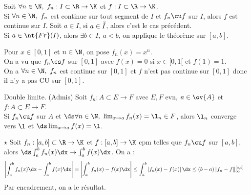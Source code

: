 \documentclass[11pt]{article}
\begin{document}
\vspace*{-0.8cm}

\begin{corr}{}{}
    Soit $\forall n \in \N, ~ f_n:I\subset\R\to\K$ et $f:I\subset\R\to\K$.\\
    Si $\forall n \in \N, ~ f_n$ est continue sur tout segment de $I$ et $f_n\cu f$ sur $I$, alors $f$ est continue sur $I$.
    \tcblower
    Soit $a\in I$, si $a\in\accentset{\circ}{I}$, alors c'est le cas précédent.\\
    Si $a\in\nt{Fr}(I)$, alors $\exists b \in I, ~ a < b$, on applique le théorème sur $[a,b]$.
\end{corr}

\vspace*{-0.8cm}

\begin{ex}{}{}
    Pour $x\in[0,1]$ et $n\in\N$, on pose $f_n(x)=x^n$.\\
    On a vu que $f_n\cs f$ sur $[0,1]$ avec $f(x)=0$ si $x\in[0,1[$ et $f(1)=1$.\\
    On a $\forall n \in \N, ~ f_n$ est continue sur $[0,1]$ et $f$ n'est pas continue sur $[0,1]$ donc il n'y a pas CU sur $[0,1]$. 
\end{ex}

\vspace*{-0.8cm}

\begin{thm}{Double limite. (Admis)}{}
    Soit $f_n:A\subset E \to F$ avec $E,F$ evn, $a \in \ov{A}$ et $f:A\subset E \to F$.\\
    Si $f_n\cu f$ sur $A$ et $\ds \forall n \in \N, ~ \lim_{x\to a}f_n(x)=\l_n\in F$, alors $\l_n$ converge vers $\l$ et $\ds \lim_{x\to a}f(x)=\l$.
\end{thm}

\vspace*{-0.8cm}

\begin{thm}{$\star$}{}
    Soit $f_n:[a,b]\subset\R\to\K$ et $f:[a,b]\to\K$ cpm telles que $f_n\cu f$ sur $[a,b]$, alors $\ds\int_a^b f_n(x)\dx\to\int_a^bf(x)\dx$.
    \tcblower
    On a :
    \begin{align*}
        \left|\int_a^bf_n(x)\dx - \int_a^bf(x)\dx\right| & = \left|\int_a^bf_n(x)-f(x)\dx\right| \leq \int_a^b\left|f_n(x)-f(x)\right|\dx \leq (b-a)\|f_n - f\|_\infty^{[a,b]}
    \end{align*}
    Par encadrement, on a le résultat.
\end{thm}
\end{document}
